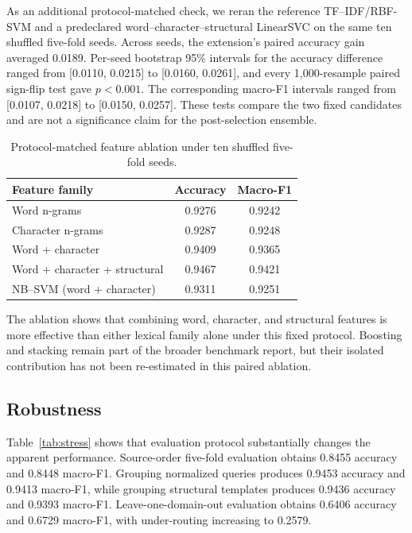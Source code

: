 \documentclass[conference]{IEEEtran}
\begin{document}
As an additional protocol-matched check, we reran the reference TF--IDF/RBF-SVM
and a predeclared word--character--structural LinearSVC on the same ten shuffled
five-fold seeds. Across seeds, the extension's paired accuracy gain averaged
0.0189. Per-seed bootstrap 95\% intervals for the accuracy difference ranged
from [0.0110, 0.0215] to [0.0160, 0.0261], and every 1,000-resample paired
sign-flip test gave $p<0.001$. The corresponding macro-F1 intervals ranged from
[0.0107, 0.0218] to [0.0150, 0.0257]. These tests compare the two fixed
candidates and are not a significance claim for the post-selection ensemble.

\begin{table}[t]
\centering
\small
\setlength{\tabcolsep}{3pt}
\caption{Protocol-matched feature ablation under ten shuffled five-fold seeds.}
\label{tab:ablation}
\begin{tabular}{lcc}
\toprule
Feature family & Accuracy & Macro-F1 \\
\midrule
Word n-grams & 0.9276 & 0.9242 \\
Character n-grams & 0.9287 & 0.9248 \\
Word + character & 0.9409 & 0.9365 \\
Word + character + structural & 0.9467 & 0.9421 \\
NB--SVM (word + character) & 0.9311 & 0.9251 \\
\bottomrule
\end{tabular}
\end{table}

The ablation shows that combining word, character, and structural features is
more effective than either lexical family alone under this fixed protocol.
Boosting and stacking remain part of the broader benchmark report, but their
isolated contribution has not been re-estimated in this paired ablation.

\subsection{Robustness}
Table~\ref{tab:stress} shows that evaluation protocol substantially changes the apparent performance. Source-order five-fold evaluation obtains 0.8455 accuracy and 0.8448 macro-F1. Grouping normalized queries produces 0.9453 accuracy and 0.9413 macro-F1, while grouping structural templates produces 0.9436 accuracy and 0.9393 macro-F1. Leave-one-domain-out evaluation obtains 0.6406 accuracy and 0.6729 macro-F1, with under-routing increasing to 0.2579.
\end{document}

